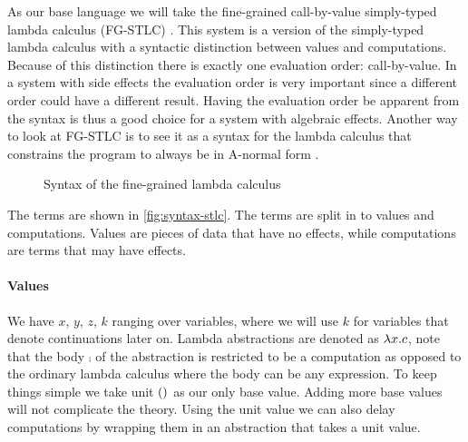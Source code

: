 {As our base language we will take the fine-grained call-by-value simply-typed lambda calculus (FG-STLC) \autocite{fg-stlc}.
This system is a version of the simply-typed lambda calculus with a syntactic distinction between values and computations.
Because of this distinction there is exactly one evaluation order: call-by-value.
In a system with side effects the evaluation order is very important since a different order could have a different result.
Having the evaluation order be apparent from the syntax is thus a good choice for a system with algebraic effects.
Another way to look at FG-STLC is to see it as a syntax for the lambda calculus that constrains the program to always be in A-normal form \autocite{anormalform}.


\begin{figure}
\caption{Syntax of the fine-grained lambda calculus}
\centering
{}
\end{figure}

The terms are shown in \cref{fig:syntax-stlc}.
The terms are split in to values and computations.
Values are pieces of data that have no effects, while computations are terms that may have effects.

\paragraph{Values} We have $x$, $y$, $z$, $k$ ranging over variables, where we will use $k$ for variables that denote continuations later on.
Lambda abstractions are denoted as $\lambda x . c$, note that the body $\comp$ of the abstraction is restricted to be a computation as opposed to the ordinary lambda calculus where the body can be any expression.
To keep things simple we take unit $()$ as our only base value. Adding more base values will not complicate the theory.
Using the unit value we can also delay computations by wrapping them in an abstraction that takes a unit value.
\\\\
}
